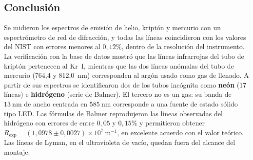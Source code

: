 \documentclass{article}
\newcommand{\nm}{\ \mathrm{nm}}
\begin{document}
\subsection{Conclusión}

Se midieron los espectros de emisión de helio, kriptón y mercurio con un espectrómetro de red de difracción, y todas las líneas coincidieron con los valores del NIST con errores menores al $0,12\%$, dentro de la resolución del instrumento. La verificación con la base de datos mostró que las líneas infrarrojas del tubo de kriptón pertenecen al Kr~I, mientras que las dos líneas anómalas del tubo de mercurio (764,4 y 812,0~nm) corresponden al argón usado como gas de llenado. A partir de sus espectros se identificaron dos de los tubos incógnita como \textbf{neón} (17 líneas) e \textbf{hidrógeno} (serie de Balmer). El tercero no es un gas: su banda de $13\nm$ de ancho centrada en $585\nm$ corresponde a una fuente de estado sólido tipo LED. Las fórmulas de Balmer reprodujeron las líneas observadas del hidrógeno con errores de entre $0,05$ y $0,15\%$ y permitieron obtener $R_{\mathrm{exp}}=(1,0978\pm0,0027)\times10^{7}\ \mathrm{m^{-1}}$, en excelente acuerdo con el valor teórico. Las líneas de Lyman, en el ultravioleta de vacío, quedan fuera del alcance del montaje.

\end{document}
